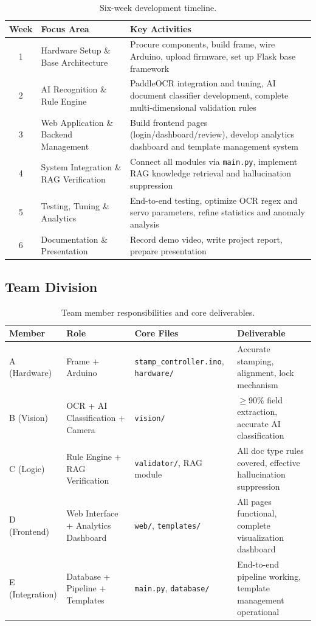\documentclass[conference]{IEEEtran}
\begin{document}
\begin{table}[H]
\centering
\caption{Six-week development timeline.}
\label{tab:timeline}
\begin{tabular}{@{}clp{7cm}@{}}
\toprule
\textbf{Week} & \textbf{Focus Area} & \textbf{Key Activities} \\
\midrule
1 & Hardware Setup \& Base Architecture & Procure components, build frame, wire Arduino, upload firmware, set up Flask base framework \\
2 & AI Recognition \& Rule Engine & PaddleOCR integration and tuning, AI document classifier development, complete multi-dimensional validation rules \\
3 & Web Application \& Backend Management & Build frontend pages (login/dashboard/review), develop analytics dashboard and template management system \\
4 & System Integration \& RAG Verification & Connect all modules via \texttt{main.py}, implement RAG knowledge retrieval and hallucination suppression \\
5 & Testing, Tuning \& Analytics & End-to-end testing, optimize OCR regex and servo parameters, refine statistics and anomaly analysis \\
6 & Documentation \& Presentation & Record demo video, write project report, prepare presentation \\
\bottomrule
\end{tabular}
\end{table}

\subsection{Team Division}

\begin{table}[H]
\centering
\caption{Team member responsibilities and core deliverables.}
\label{tab:team}
\begin{tabular}{@{}llp{3cm}p{4cm}@{}}
\toprule
\textbf{Member} & \textbf{Role} & \textbf{Core Files} & \textbf{Deliverable} \\
\midrule
A (Hardware) & Frame + Arduino & \texttt{stamp\_controller.ino}, \texttt{hardware/} & Accurate stamping, alignment, lock mechanism \\
B (Vision) & OCR + AI Classification + Camera & \texttt{vision/} & $\geq$90\% field extraction, accurate AI classification \\
C (Logic) & Rule Engine + RAG Verification & \texttt{validator/}, RAG module & All doc type rules covered, effective hallucination suppression \\
D (Frontend) & Web Interface + Analytics Dashboard & \texttt{web/}, \texttt{templates/} & All pages functional, complete visualization dashboard \\
E (Integration) & Database + Pipeline + Templates & \texttt{main.py}, \texttt{database/} & End-to-end pipeline working, template management operational \\
\bottomrule
\end{tabular}
\end{table}
\end{document}
